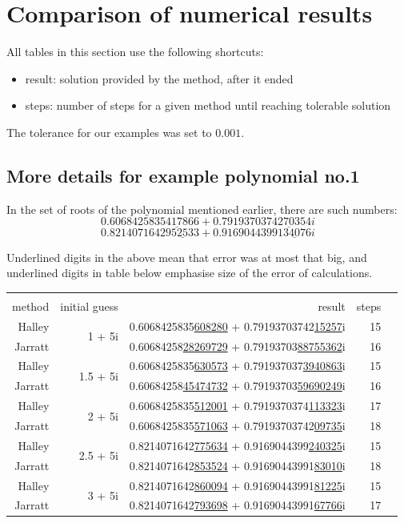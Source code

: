 \documentclass{article}
\begin{document}
\section{Comparison of numerical results}

All tables in this section use the following shortcuts:
\begin{itemize}
  \item result: solution provided by the method, after it ended 
  \item steps: number of steps for a given method until reaching tolerable solution
\end{itemize}

The tolerance for our examples was set to $0.001$.

\subsection{More details for example polynomial no.1}
In the set of roots of the polynomial mentioned earlier, there are such numbers:
\[0.60684258\underline{35417866} +0.79193703\underline{74270354}i\]
\[0.8214071642\underline{952533} +0.9169044399\underline{134076}i\]

Underlined digits in the above mean that error was at most that big, and underlined digits in table
below emphasise size of the error of calculations.

\begin{tabular}{rrrrr}
\multicolumn{2}{c}{} & \multicolumn{2}{c}{} \\
method & initial guess & result & steps \\
\hline
Halley & \multirow{2}{*}{1 + 5i}
& 0.6068425835\underline{608280} + 0.79193703742\underline{15257}i & 15 \\
Jarratt &
& 0.60684258\underline{28269729} + 0.79193703\underline{88755362}i & 16 \\

Halley & \multirow{2}{*}{1.5 + 5i}
& 0.6068425835\underline{630573} + 0.791937037\underline{3940863}i & 15 \\
Jarratt &
& 0.60684258\underline{45474732} + 0.79193703\underline{59690249}i & 16 \\

Halley & \multirow{2}{*}{2 + 5i}
& 0.6068425835\underline{512001} + 0.7919370374\underline{113323}i & 17 \\
Jarratt &
& 0.6068425835\underline{571063} + 0.79193703742\underline{09735}i & 18 \\

Halley & \multirow{2}{*}{2.5 + 5i}
& 0.8214071642\underline{775634} + 0.9169044399\underline{240325}i & 15 \\
Jarratt &
& 0.8214071642\underline{853524} + 0.91690443991\underline{83010}i & 18 \\

Halley & \multirow{2}{*}{3 + 5i}
& 0.8214071642\underline{860094} + 0.91690443991\underline{81225}i & 15 \\
Jarratt &
& 0.8214071642\underline{793698} + 0.91690443991\underline{67766}i & 17 \\
\end{tabular}
\vspace{10pt}
\end{document}
